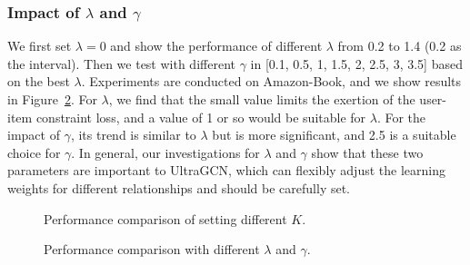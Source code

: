 \documentclass[sigconf,authorversion]{acmart}
\begin{document}
\subsubsection{Impact of $\lambda$ and $\gamma$}
We first set $\lambda=0$ and show the performance of different $\lambda$ from 0.2 to 1.4 (0.2 as the interval). Then we test with different $\gamma$ in [0.1, 0.5, 1, 1.5, 2, 2.5, 3, 3.5] based on the best $\lambda$. Experiments are conducted on Amazon-Book, and we show results in Figure~\ref{param_lambda_gamma}.
For $\lambda$, we find that the small value limits the exertion of the user-item constraint loss, and a value of 1 or so would be suitable for $\lambda$.
For the impact of $\gamma$, its trend is similar to $\lambda$ but is more significant, and 2.5 is a suitable choice for $\gamma$. In general, our investigations for $\lambda$ and $\gamma$ show that these two parameters are important to UltraGCN, which can flexibly adjust the learning weights for different relationships and should be carefully set.  
 
 
\begin{figure}[!t]
	\centering  {}
	\vspace{-2ex}
	\caption{Performance comparison of setting different $K$.}
	\vspace{-2ex}
	\label{param_k}
\end{figure}



\begin{figure}[!t]
	\centering  {}
	\vspace{-2ex}	
	\caption{Performance comparison with different $\lambda$ and $\gamma$.}
	\label{param_lambda_gamma}
\end{figure}
\end{document}
